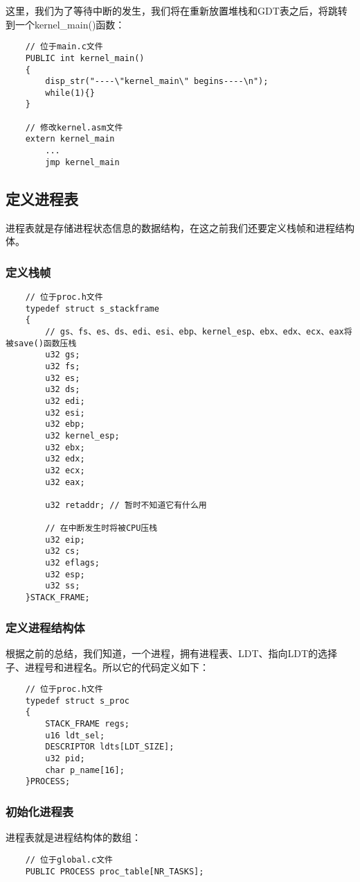 \documentclass[a4paper,left=2.5cm,right=2.5cm,11pt]{report}
\begin{document}
	这里，我们为了等待中断的发生，我们将在重新放置堆栈和GDT表之后，将跳转到一个kernel\_main()函数：
	\begin{lstlisting}
	// 位于main.c文件
	PUBLIC int kernel_main()
	{
		disp_str("----\"kernel_main\" begins----\n");
		while(1){}
	}

	// 修改kernel.asm文件
	extern kernel_main
		...
		jmp kernel_main
	\end{lstlisting}

\subsection{定义进程表}
	进程表就是存储进程状态信息的数据结构，在这之前我们还要定义栈帧和进程结构体。

\subsubsection{定义栈帧}
	\begin{lstlisting}
	// 位于proc.h文件
	typedef struct s_stackframe
	{
		// gs、fs、es、ds、edi、esi、ebp、kernel_esp、ebx、edx、ecx、eax将被save()函数压栈
		u32 gs;
		u32 fs;
		u32 es;
		u32 ds;
		u32 edi;
		u32 esi;
		u32 ebp;
		u32 kernel_esp;
		u32 ebx;
		u32 edx;
		u32 ecx;
		u32 eax;

		u32 retaddr; // 暂时不知道它有什么用

		// 在中断发生时将被CPU压栈
		u32 eip;
		u32 cs;
		u32 eflags;
		u32 esp;
		u32 ss;
	}STACK_FRAME;
	\end{lstlisting}

\subsubsection{定义进程结构体}
	根据之前的总结，我们知道，一个进程，拥有进程表、LDT、指向LDT的选择子、进程号和进程名。所以它的代码定义如下：
	\begin{lstlisting}
	// 位于proc.h文件
	typedef struct s_proc
	{
		STACK_FRAME regs;
		u16 ldt_sel;
		DESCRIPTOR ldts[LDT_SIZE];
		u32 pid;
		char p_name[16];
	}PROCESS;
	\end{lstlisting}

\subsubsection{初始化进程表}
	进程表就是进程结构体的数组：
	\begin{lstlisting}
	// 位于global.c文件
	PUBLIC PROCESS proc_table[NR_TASKS];
	\end{lstlisting}
\end{document}
